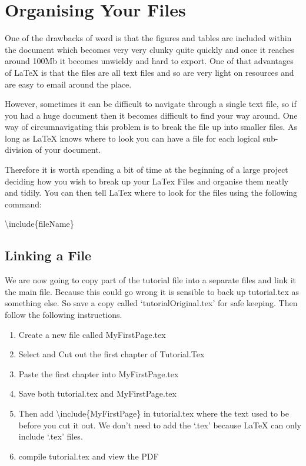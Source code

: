 \chapter{Organising Your Files}
One of the drawbacks of word is that the figures and tables are included within the document which becomes very very clunky quite quickly and once it reaches around 100Mb it becomes unwieldy and hard to export. One of that advantages of LaTeX is that the files are all text files and so are very light on resources and are easy to email around the place.

However, sometimes it can be difficult to navigate through a single text file, so if you had a huge document then it becomes difficult to find your way around.  One way of circumnavigating this problem is to break the file up into smaller files. As long as LaTeX knows where to look you can have a file for each logical sub-division of your document.

Therefore it is worth spending a bit of time at the beginning of a large project deciding how you wish to break up your LaTex Files and organise them neatly and tidily.  You can then tell LaTex where to look for the files using the following command:

\vspace*{2ex}
{\textbackslash}include\{fileName\}
\vspace*{2ex}

\pagebreak
\section{Linking a File}
We are now going to copy part of the tutorial file into a separate files and link it the main file.  Because this could go wrong it is sensible to back up tutorial.tex as something else. So save a copy called `tutorialOriginal.tex' for safe keeping. Then follow the following instructions.

\begin{enumerate}
\item Create a new file called MyFirstPage.tex
\item Select and Cut out the first chapter of Tutorial.Tex
\item Paste the first chapter into MyFirstPage.tex
\item Save both tutorial.tex and MyFirstPage.tex
\item Then add {\textbackslash}include\{MyFirstPage\} in tutorial.tex where the text used to be before you cut it out. We don't need to add the `.tex' because LaTeX can only include `.tex' files.
\item compile tutorial.tex and view the PDF
\end{enumerate}

